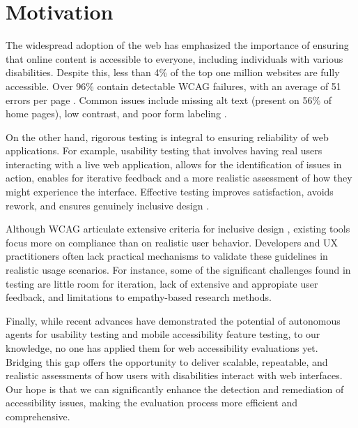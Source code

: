
\section{Motivation}

The widespread adoption of the web has emphasized the importance of ensuring that online content is accessible to everyone, including individuals with various disabilities\cite{abu2023web}. Despite this, less than 4\% of the top one million websites are fully accessible. Over 96\% contain detectable \ac{WCAG} failures, with an average of 51 errors per page \cite{webaimmillion2025}. Common issues include missing alt text (present on 56\% of home pages), low contrast, and poor form labeling \cite{audioeye2024}.


On the other hand, rigorous testing is integral to ensuring reliability of web applications. For example, usability testing that involves having real users interacting with a live web application, allows for the identification of issues in action, enables for iterative feedback and a more realistic assessment of how they might experience the interface. Effective testing improves satisfaction, avoids rework, and ensures genuinely inclusive design \cite{accessdesign2025}.

Although \ac{WCAG} articulate extensive criteria for inclusive design \cite{w3c_WCAG22}, existing tools focus more on compliance than on realistic user behavior. Developers and UX practitioners often lack practical mechanisms to validate these guidelines in realistic usage scenarios. For instance, some of the significant challenges found in testing are little room for iteration, lack of extensive and appropiate user feedback, and limitations to empathy-based research methods\cite{lu2025uxagent}.

Finally, while recent advances have demonstrated the potential of autonomous agents for usability testing\cite{lu2025uxagent} and mobile accessibility feature testing\cite{taeb2024axnav}, to our knowledge, no one has applied them for web accessibility evaluations yet. Bridging this gap offers the opportunity to deliver scalable, repeatable, and realistic assessments of how users with disabilities interact with web interfaces. Our hope is that we can significantly enhance the detection and remediation of accessibility issues, making the evaluation process more efficient and comprehensive.

